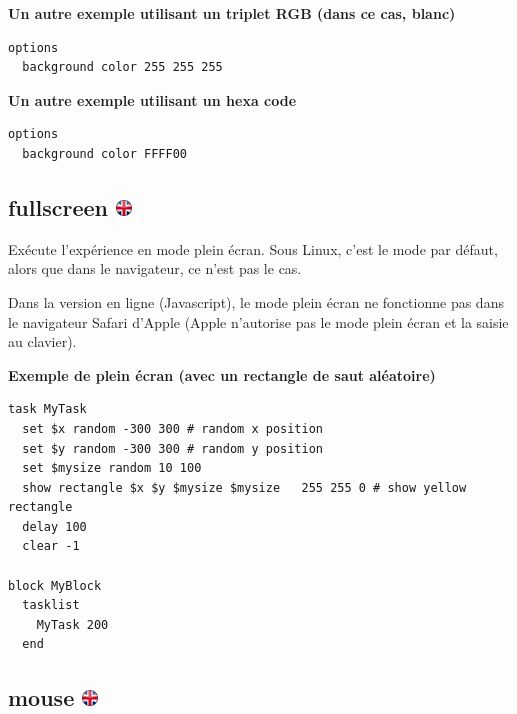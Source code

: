 \documentclass[
]{book}
\begin{document}
\textbf{Un autre exemple utilisant un triplet RGB (dans ce cas, blanc)}

\begin{verbatim}
options
  background color 255 255 255
\end{verbatim}

\textbf{Un autre exemple utilisant un hexa code}

\begin{verbatim}
options
  background color FFFF00
\end{verbatim}

\hypertarget{fullscreen}{%
\subsection[fullscreen ]{\texorpdfstring{fullscreen \href{https://www.psytoolkit.org/doc3.2.0/syntax.html\#options-fullscreen}{\protect\includegraphics{img/ukflag.png}}}{fullscreen }}\label{fullscreen}}

Exécute l'expérience en mode plein écran. Sous Linux, c'est le mode par défaut, alors que dans le navigateur, ce n'est pas le cas.

Dans la version en ligne (Javascript), le mode plein écran ne fonctionne pas dans le navigateur Safari d'Apple (Apple n'autorise pas le mode plein écran et la saisie au clavier).

\textbf{Exemple de plein écran (avec un rectangle de saut aléatoire)}

\begin{verbatim}
task MyTask
  set $x random -300 300 # random x position
  set $y random -300 300 # random y position
  set $mysize random 10 100
  show rectangle $x $y $mysize $mysize   255 255 0 # show yellow rectangle
  delay 100
  clear -1

block MyBlock
  tasklist
    MyTask 200
  end
\end{verbatim}

\hypertarget{mouse}{%
\subsection[mouse ]{\texorpdfstring{mouse \href{https://www.psytoolkit.org/doc3.2.0/syntax.html\#options-mouse}{\protect\includegraphics{img/ukflag.png}}}{mouse }}\label{mouse}}
\end{document}

